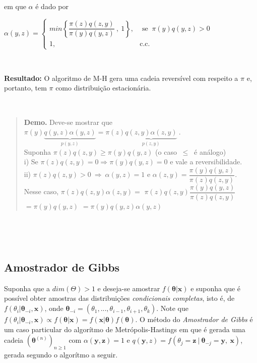 \documentclass[
]{book}
\begin{document}
em que \(\alpha\) é dado por

\(\alpha(y,z)=\left\{\begin{array}{cl} min\left\{ \dfrac{\pi(z)q(z,y)}{\pi(y)q(y,z)}~,~1\right\},& \text{ se }~ \pi(y)q(y,z)>0\\ 1,& \text{c.c.}\end{array}\right.\)

\(~\)

\textbf{Resultado:} O algoritmo de M-H gera uma cadeia reversível com respeito a \(\pi\) e, portanto, tem \(\pi\) como distribuição estacionária.

\(~\)

\begin{quote}
\textbf{Demo.} Deve-se mostrar que \(\pi(y)\underbrace{q(y,z)\alpha(y,z)}_{p(y,z)}=\pi(z)\underbrace{q(z,y)\alpha(z,y)}_{p(z,y)}~.\)\\
Suponha \(\pi(z)q(z,y)\geq \pi(y)q(y,z)\) (o caso \(~\leq~\) é análogo)\\
i) Se \(\pi(z)q(z,y)=0\Rightarrow\pi(y)q(y,z)=0\) e vale a reversibilidade.\\
ii) \(\pi(z)q(z,y)>0 ~\Rightarrow~ \alpha(y,z)=1\) e \(\alpha(z,y)=\dfrac{\pi(y)q(y,z)}{\pi(z)q(z,y)}\).\\
Nesse caso, \(\pi(z)q(z,y)\alpha(z,y)=\) \(\pi(z)q(z,y)\dfrac{\pi(y)q(y,z)}{\pi(z)q(z,y)}\) \(=\pi(y)q(y,z)\) \(=\pi(y)q(y,z)\alpha(y,z)\)
\end{quote}

\(~\)

\(~\)

\hypertarget{amostrador-de-gibbs}{%
\subsection{Amostrador de Gibbs}\label{amostrador-de-gibbs}}

Suponha que a \(dim(\Theta)>1\) e deseja-se amostrar \(f(\boldsymbol \theta| \boldsymbol x)\) e suponha que é possível obter amostras das distribuições \emph{condicionais completas}, isto é, de \(f(\theta_i| \boldsymbol \theta_{-i},\boldsymbol x)\), onde \(\boldsymbol \theta_{-i}=(\theta_1,...,\theta_{i-1},\theta_{i+1},\theta_k)\). Note que \(f(\theta_i| \boldsymbol \theta_{-i},\boldsymbol x)\propto f(\boldsymbol \theta| \boldsymbol x)=f(\boldsymbol x|\boldsymbol \theta)f(\boldsymbol \theta)\). O método do \emph{Amostrador de Gibbs} é um caso particular do algorítmo de Metrópolis-Hastings em que é gerada uma cadeia \(\left(\boldsymbol \theta^{(n)}\right)_{n\geq 1}\) com \(\alpha(\boldsymbol{y},\boldsymbol{z})=1\) e \(q(\boldsymbol{y},z)=f\left({\theta}_j=\boldsymbol{z}~ \big|~ \boldsymbol{\theta}_{-j}=\boldsymbol{y},~\boldsymbol{x}\right)\), gerada segundo o algorítmo a seguir.
\end{document}
